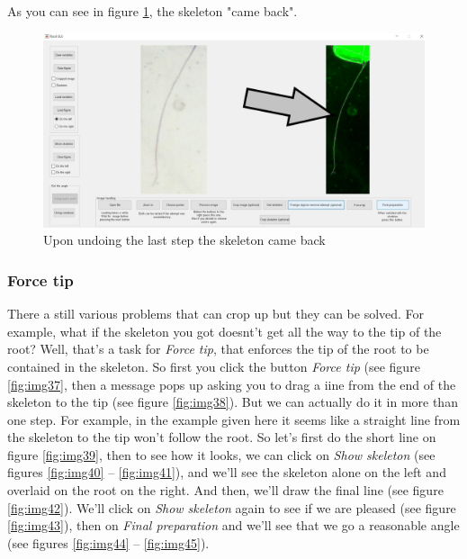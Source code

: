 As you can see in figure \ref{fig:img36}, the skeleton "came back".

\begin{figure}[H]
	\centering
	\includegraphics[width=\textwidth]{../Figures/manual/optionalA7.jpg}
	\caption{Upon undoing the last step the skeleton came back}
	\label{fig:img36}
\end{figure}


\subsubsection{Force tip}

There a still various problems that can crop up but they can be solved.
For example, what if the skeleton you got doesnt't get all the way to the tip of the root? 
Well, that's a task for \textit{Force tip}, that enforces the tip of the root to be contained in the skeleton. 
So first you click the button \textit{Force tip} (see figure \ref{fig:img37}, then a message pops up asking you to drag a iine from the end of the skeleton to the tip (see figure \ref{fig:img38}).
But we can actually do it in more than one step. For example, in the example given here it seems like a straight line from the skeleton to the tip won't follow the root. 
So let's first do the short line on figure \ref{fig:img39}, then to see how it looks, we can click on \textit{Show skeleton} (see figures \ref{fig:img40} -- \ref{fig:img41}),
and we'll see the skeleton alone on the left and overlaid on the root on the right. 
And then, we'll draw the final line (see figure \ref{fig:img42}).
We'll click on \textit{Show skeleton} again to see if we are pleased (see figure \ref{fig:img43}), then on \textit{Final preparation} and we'll see that we go a reasonable angle (see figures \ref{fig:img44} -- \ref{fig:img45}).



